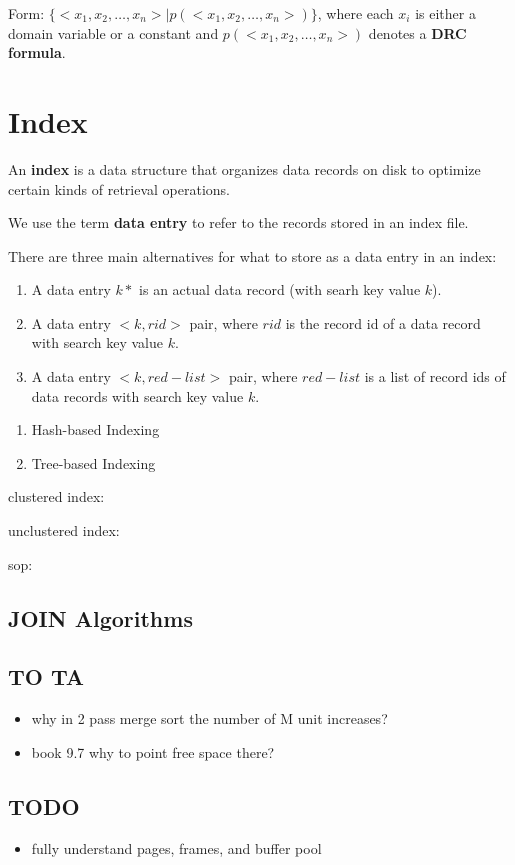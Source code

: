 \documentclass[12pt,a4paper]{article}
\begin{document}
Form: $\{<x_1,x_2,\dots,x_n> \mid p(<x_1,x_2,\dots,x_n>)\}$, 
where each $x_i$ is either a domain variable or a constant
and $p(<x_1, x_2,\dots,x_n>)$ denotes a \textbf{DRC formula}.

\section*{Index}

An \textbf{index} is a data structure that organizes data records on disk to optimize certain kinds of retrieval operations.

We use the term \textbf{data entry} to refer to the records stored in an index file.

There are three main alternatives for what to store as a data entry in an index:

\begin{enumerate}
    \item A data entry $k*$ is an actual data record (with searh key value $k$).
    \item A data entry $<k, rid>$ pair, where $rid$ is the record id of a data record with search key value $k$.
    \item A data entry $<k, red-list>$ pair, where $red-list$ is a list of record ids of data records with search key value $k$. 
\end{enumerate}

\begin{enumerate}
    \item Hash-based Indexing
    \item Tree-based Indexing
\end{enumerate}

clustered index:

unclustered index:

sop:

\subsection*{JOIN Algorithms}



\subsection*{TO TA}

\begin{itemize}
    \item why in 2 pass merge sort the number of M unit increases?
    \item book 9.7 why to point free space there?
\end{itemize}

\subsection*{TODO}

\begin{itemize}
    \item fully understand pages, frames, and buffer pool
\end{itemize}
\end{document}

